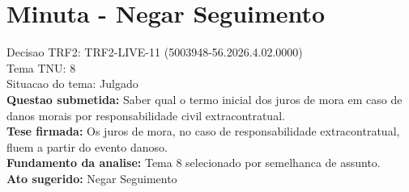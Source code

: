 \documentclass{article}
\begin{document}
\section*{Minuta - Negar Seguimento}
Decisao TRF2: TRF2-LIVE-11 (5003948-56.2026.4.02.0000)\\
Tema TNU: 8\\
Situacao do tema: Julgado\\
\textbf{Questao submetida:} Saber qual o termo inicial dos juros de mora em caso de danos morais por responsabilidade civil extracontratual.\\
\textbf{Tese firmada:} Os juros de mora, no caso de responsabilidade extracontratual, fluem a partir do evento danoso.\\
\textbf{Fundamento da analise:} Tema 8 selecionado por semelhanca de assunto.\\
\textbf{Ato sugerido:} Negar Seguimento
\end{document}
